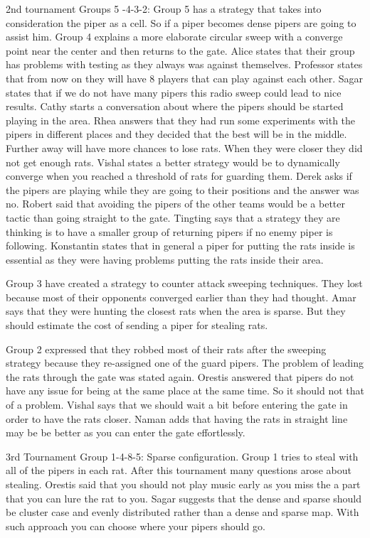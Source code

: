 2nd tournament Groups 5 -4-3-2:
Group 5 has a strategy that takes into consideration the piper as a cell. So if a piper becomes dense pipers are going to assist him.
Group 4 explains a more elaborate circular sweep with a converge point near the center and then returns to the gate.
Alice states that their group has problems with testing as they always was against themselves.
Professor states that from now on they will have 8 players that can play against each other.
Sagar states that if we do not have many pipers this radio sweep could lead to nice results.
Cathy starts a conversation about where the pipers should be started playing in the area.
Rhea answers that they had run some experiments with the pipers in different places and they decided that the best will be in the middle. Further away will have more chances to lose rats. When they were closer they did not get enough rats. 
Vishal states a better strategy would be to dynamically converge when you reached a threshold of rats for guarding them.
Derek asks if the pipers are playing while they are going to their positions and the answer was no.
Robert said that avoiding the pipers of the other teams would be a better tactic than going straight to the gate.
Tingting says that a strategy they are thinking is to have a smaller group of returning pipers if no enemy piper is following.
Konstantin states that in general a piper for putting the rats inside is essential as they were having problems putting the rats inside their area.

Group 3 have created a strategy to counter attack sweeping techniques. They lost 
because most of their opponents converged earlier than they had thought.
Amar says that they were hunting the closest rats when the area is sparse. But 
they should estimate the cost of sending a piper for stealing rats.

Group 2 expressed that they robbed most of their rats after the sweeping strategy 
because they re-assigned one of the guard pipers. 
The problem of leading the rats through the gate was stated again. Orestis answered 
that pipers do not have any issue for being at the same place at the same time. 
So it should not that of a problem.
Vishal says that we should wait a bit before entering the gate in order to have 
the rats closer.
Naman adds that having the rats in straight line may be be better as you can enter 
the gate effortlessly.

3rd Tournament Group 1-4-8-5:
Sparse configuration.
Group 1 tries to steal with all of the pipers in each rat.
After this tournament many questions arose about stealing. Orestis said that you should not play music early as you miss the a part that you can lure the rat to you.
Sagar suggests that the dense and sparse should be cluster case and evenly distributed rather than a dense and sparse map. With such approach you can choose where your pipers should go. 


